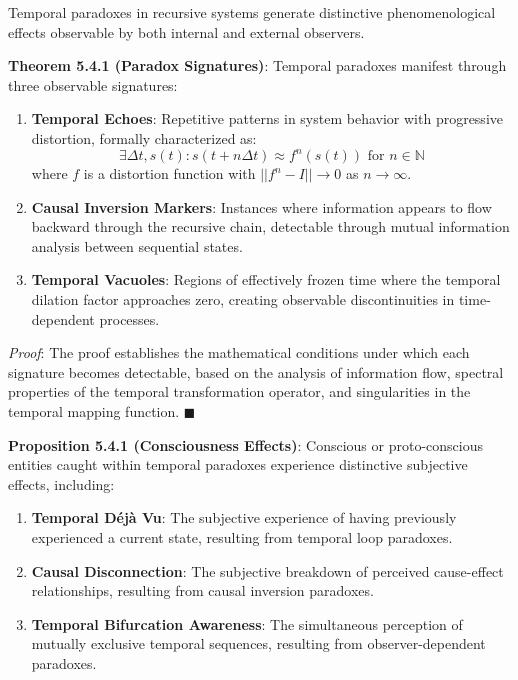 \documentclass[
]{article}
\begin{document}
Temporal paradoxes in recursive systems generate distinctive
phenomenological effects observable by both internal and external
observers.

\textbf{Theorem 5.4.1 (Paradox Signatures)}: Temporal paradoxes manifest
through three observable signatures:

\begin{enumerate}
\def\labelenumi{\arabic{enumi}.}
\item
  \textbf{Temporal Echoes}: Repetitive patterns in system behavior with
  progressive distortion, formally characterized as:
  \[\exists \Delta t, s(t) : s(t + n\Delta t) \approx f^n(s(t)) \text{ for } n \in \mathbb{N}\]
  where \(f\) is a distortion function with \(||f^n - I|| \to 0\) as
  \(n \to \infty\).
\item
  \textbf{Causal Inversion Markers}: Instances where information appears
  to flow backward through the recursive chain, detectable through
  mutual information analysis between sequential states.
\item
  \textbf{Temporal Vacuoles}: Regions of effectively frozen time where
  the temporal dilation factor approaches zero, creating observable
  discontinuities in time-dependent processes.
\end{enumerate}

\emph{Proof}: The proof establishes the mathematical conditions under
which each signature becomes detectable, based on the analysis of
information flow, spectral properties of the temporal transformation
operator, and singularities in the temporal mapping function.
\(\blacksquare \)

\textbf{Proposition 5.4.1 (Consciousness Effects)}: Conscious or
proto-conscious entities caught within temporal paradoxes experience
distinctive subjective effects, including:

\begin{enumerate}
\def\labelenumi{\arabic{enumi}.}
\item
  \textbf{Temporal Déjà Vu}: The subjective experience of having
  previously experienced a current state, resulting from temporal loop
  paradoxes.
\item
  \textbf{Causal Disconnection}: The subjective breakdown of perceived
  cause-effect relationships, resulting from causal inversion paradoxes.
\item
  \textbf{Temporal Bifurcation Awareness}: The simultaneous perception
  of mutually exclusive temporal sequences, resulting from
  observer-dependent paradoxes.
\end{enumerate}
\end{document}
